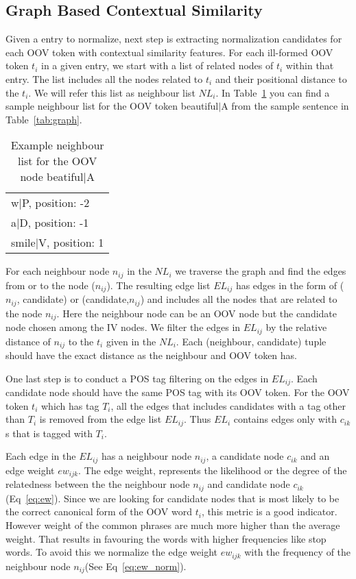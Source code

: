 \subsection{Graph Based Contextual Similarity}

Given a entry to normalize, next step is extracting normalization candidates for each OOV token with contextual similarity features. For each ill-formed OOV token $t_i$ in a given entry, we start with a list of related nodes of $t_i$ within that entry. The list includes all the nodes related to $t_i$ and their positional distance to the $t_i$. We will refer this list as neighbour list $NL_i$. In Table~\ref{tab:neigh} you can find a sample neighbour list for the OOV token beautiful$|$A from the sample sentence in Table~\ref{tab:graph}.

\begin{table}[hbt]
  \centering
  \begin{tabular}[tc]{l}
    w$|$P, position: -2 \\
    a$|$D, position: -1 \\
    smile$|$V, position: 1 \\
  \end{tabular}
\caption{Example neighbour list for the OOV node beatiful$|$A}
\label{tab:neigh}
\end{table}


For each neighbour node $n_{ij}$ in the $NL_i$  we traverse the graph and find the edges from or to the node ($n_{ij}$). The resulting edge list $EL_{ij}$ has edges in the form of ($n_{ij}$, candidate) or (candidate,$n_{ij}$) and includes all the nodes that are related to the node $n_{ij}$. Here the neighbour node can be an OOV node but the candidate node chosen among the IV nodes. We filter the edges in $EL_{ij}$ by the relative distance of $n_{ij}$ to the $t_i$ given in the $NL_i$. Each (neighbour, candidate) tuple should have the exact distance as the neighbour and OOV token has.

One last step is to conduct a POS tag filtering on the edges in $EL_{ij}$. Each candidate node should have the same POS tag with its OOV token. For the OOV token $t_i$ which has tag $T_i$, all the edges that includes candidates with a tag other than $T_i$ is removed from the edge list $EL_{ij}$. Thus $EL_{i}$ contains edges only with $c_{ik}$s that is tagged with $T_i$.

Each edge in the $EL_{ij}$ has a neighbour node $n_{ij}$, a candidate node $c_{ik}$ and an edge weight $ew_{ijk}$. The edge weight, represents the likelihood or the degree of the relatedness between the the neighbour node $n_{ij}$ and candidate node $c_{ik}$(Eq~\ref{eq:ew}). Since we are looking for candidate nodes that is most likely to be the correct canonical form of the OOV word $t_i$, this metric is a good indicator. However weight of the common phrases are much more higher than the average weight. That results in favouring the words with higher frequencies like stop words. To avoid this we normalize the edge weight $ew_{ijk}$ with the frequency of the neighbour node $n_{ij}$(See Eq~\ref{eq:ew_norm}).

